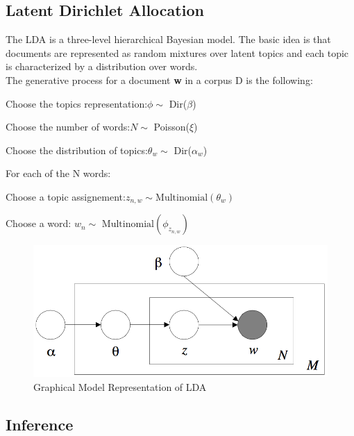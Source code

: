 \documentclass[twoside]{article}
\begin{document}
\begin{multicols}{2}
\subsection{Latent Dirichlet Allocation}

The LDA is a three-level hierarchical Bayesian model. The basic idea is that documents are represented as random mixtures over latent topics and each topic is characterized by a distribution over words.\cite{LDA}\\


\noindent The generative process for a document \textbf{w} in a corpus D is the following:
\\
\begin{compactenum}
	\item Choose the topics representation:\newline $\phi \sim$ Dir($\beta$)
	\item Choose the number of words:\newline $ N \sim $ Poisson($ \xi $)
	\item Choose the distribution of topics:\newline $\theta_w \sim$ Dir($\alpha_w$)
	\item For each of the N words:
	\begin{compactenum}
		\item Choose a topic assignement:\newline $z_{n,w} \sim \text{Multinomial}(\theta_w)$
		\item Choose a word: \newline$w_n \sim \text{ Multinomial}(\phi_{z_{n,w}})$
	\end{compactenum}
\end{compactenum}

\begin{figure}[H]
\centering
\includegraphics[width=0.8\linewidth]{img/LDA.png}
\caption{Graphical Model Representation of LDA}
\end{figure}

\subsection{Inference}


\end{multicols}
\end{document}
